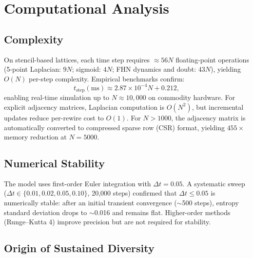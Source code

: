 \documentclass[11pt]{article}
\begin{document}
\section{Computational Analysis}
\label{sec:comp_analysis}

\subsection{Complexity}

On stencil-based lattices, each time step requires $\approx 56N$ floating-point operations (5-point Laplacian: $9N$; sigmoid: $4N$; FHN dynamics and doubt: $43N$), yielding $O(N)$ per-step complexity. Empirical benchmarks confirm:
\begin{equation}
t_{\text{step}}(\text{ms}) \approx 2.87 \times 10^{-4} N + 0.212,
\label{eq:scaling}
\end{equation}
enabling real-time simulation up to $N \approx 10{,}000$ on commodity hardware. For explicit adjacency matrices, Laplacian computation is $O(N^2)$, but incremental updates reduce per-rewire cost to $O(1)$. For $N > 1000$, the adjacency matrix is automatically converted to compressed sparse row (CSR) format, yielding $455\times$ memory reduction at $N = 5000$.

\subsection{Numerical Stability}

The model uses first-order Euler integration with $\Delta t = 0.05$. A systematic sweep ($\Delta t \in \{0.01, 0.02, 0.05, 0.10\}$, 20{,}000 steps) confirmed that $\Delta t \leq 0.05$ is numerically stable: after an initial transient convergence ($\sim$500 steps), entropy standard deviation drops to $\sim$0.016 and remains flat. Higher-order methods (Runge--Kutta 4) improve precision but are not required for stability.

\subsection{Origin of Sustained Diversity}
\end{document}
